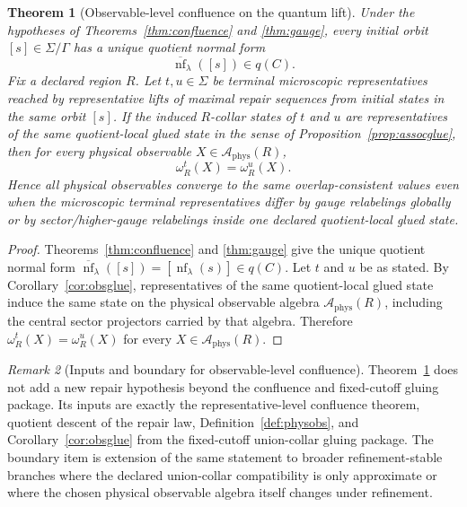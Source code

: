 \documentclass[11pt]{article}
\newtheorem{theorem}{Theorem}[section]
\theoremstyle{remark}
\newtheorem{remark}[theorem]{Remark}
\theoremstyle{plain}
\begin{document}
\begin{theorem}[Observable-level confluence on the quantum lift]\label{thm:obsconfluence}
Under the hypotheses of Theorems~\ref{thm:confluence} and \ref{thm:gauge}, every initial orbit
\([s]\in\Sigma/\Gamma\) has a unique quotient normal form
\[
\overline{\operatorname{nf}}_\lambda([s])\in q(C).
\]
Fix a declared region \(R\). Let \(t,u\in\Sigma\) be terminal microscopic representatives reached
by representative lifts of maximal repair sequences from initial states in the same orbit
\([s]\). If the induced \(R\)-collar states of \(t\) and \(u\) are representatives of the same
quotient-local glued state in the sense of
Proposition~\ref{prop:assocglue}, then for every physical observable
\(X\in\mathcal A_{\mathrm{phys}}(R)\),
\[
\omega_R^t(X)=\omega_R^u(X).
\]
Hence all physical observables converge to the same overlap-consistent values even when the
microscopic terminal representatives differ by gauge relabelings globally or by sector/higher-gauge
relabelings inside one declared quotient-local glued state.
\end{theorem}

\begin{proof}
Theorems~\ref{thm:confluence} and \ref{thm:gauge} give the unique quotient normal form
\(\overline{\operatorname{nf}}_\lambda([s])=[\operatorname{nf}_\lambda(s)]\in q(C)\). Let
\(t\) and \(u\) be as stated. By Corollary~\ref{cor:obsglue}, representatives of the same
quotient-local glued state induce the same state on the physical observable algebra
\(\mathcal A_{\mathrm{phys}}(R)\), including the central sector projectors carried by that
algebra. Therefore \(\omega_R^t(X)=\omega_R^u(X)\) for every
\(X\in\mathcal A_{\mathrm{phys}}(R)\).
\end{proof}

\begin{remark}[Inputs and boundary for observable-level confluence]\label{rem:obsconfluence}
Theorem~\ref{thm:obsconfluence} does not add a new repair hypothesis beyond the confluence and
fixed-cutoff gluing package. Its inputs are exactly the representative-level confluence theorem,
quotient descent of the repair law, Definition~\ref{def:physobs}, and
Corollary~\ref{cor:obsglue} from the fixed-cutoff union-collar gluing package. The boundary item
is extension of the same statement to broader refinement-stable branches where the declared
union-collar compatibility is only approximate or where the chosen physical observable algebra
itself changes under refinement.
\end{remark}
\end{document}
